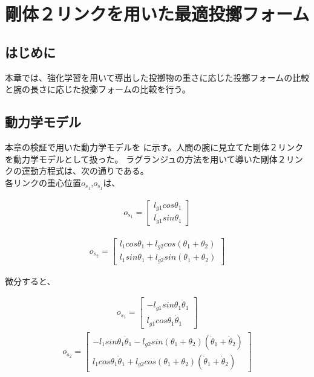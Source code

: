 \chapter[剛体２リンクによる最適投擲シミュレーション]{剛体２リンクを用いた最適投擲フォーム}

\section{はじめに}
本章では、強化学習を用いて導出した投擲物の重さに応じた投擲フォームの比較と腕の長さに応じた投擲フォームの比較を行う。
\section{動力学モデル}
本章の検証で用いた動力学モデルを
に示す。人間の腕に見立てた剛体２リンクを動力学モデルとして扱った。
ラグランジュの方法を用いて導いた剛体２リンクの運動方程式は、次の通りである。\\
各リンクの重心位置$o_{s_{1}}$,$o_{s_{1}}$は、

\begin{eqnarray}
  o_{s_{1}} = 
              \begin{bmatrix}
              l_{g1}cos\theta_{1}\\
              l_{g1}sin\theta_{1}
              \end{bmatrix}
\end{eqnarray}

\begin{eqnarray}
  o_{s_{2}} = 
              \begin{bmatrix}
              l_{1}cos\theta_{1} + l_{g2}cos(\theta_{1} + \theta_{2})\\
              l_{1}sin\theta_{1} + l_{g2}sin(\theta_{1} + \theta_{2})
              \end{bmatrix}
\end{eqnarray}

微分すると、

\begin{eqnarray}
  o_{\dot{s}_{1}} = 
              \begin{bmatrix}
              -l_{g1}sin\theta_{1}\dot{\theta}_{1}\\
              l_{g1}cos\theta_{1}\dot{\theta}_{1}
              \end{bmatrix}
\end{eqnarray}
\begin{eqnarray}
  o_{\dot{s}_{2}} = 
              \begin{bmatrix}
                -l_{1}sin\theta_{1}\dot{\theta}_{1} - l_{g2}sin(\theta_{1} + \theta_{2})(\dot{\theta}_{1} + \dot{\theta}_{2})\\
                l_{1}cos\theta_{1}\dot{\theta}_{1} + l_{g2}cos(\theta_{1} + \theta_{2})(\dot{\theta}_{1} + \dot{\theta}_{2})
              \end{bmatrix}
\end{eqnarray}

